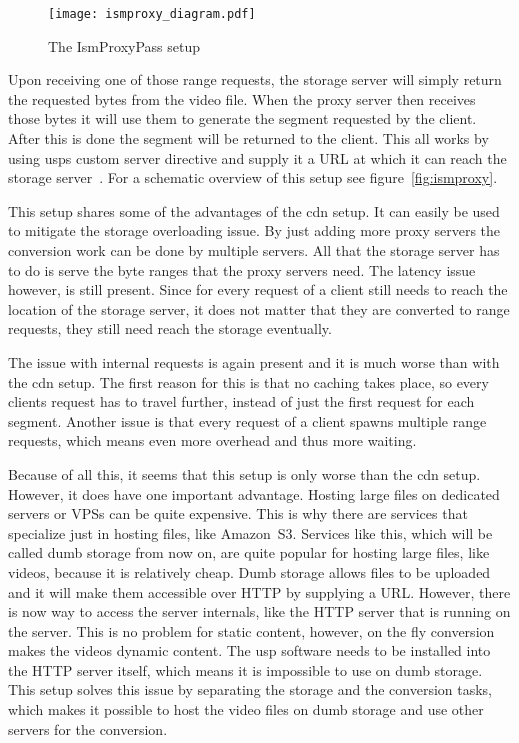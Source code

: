 \documentclass[twoside,openright]{uva-bachelor-thesis}
\begin{document}
\begin{figure}[h]
    \texttt{[image: ismproxy\_diagram.pdf]}
    \caption{The IsmProxyPass setup}\label{fig:ismproxy}
\end{figure}

Upon receiving one of those range requests, the storage server will simply
return the requested bytes from the video file. When the proxy server then
receives those bytes it will use them to generate the segment requested by the
client.  After this is done the segment will be returned to the client. This all
works by using \glspl{usp} custom \ipplong server directive and supply it a URL
at which it can reach the storage server~\autocites{uspismproxy}. For a
schematic overview of this setup see figure~\vref{fig:ismproxy}.

This setup shares some of the advantages of the \gls{cdn} setup. It can easily
be used to mitigate the storage overloading issue. By just adding more proxy
servers the conversion work can be done by multiple servers. All that the
storage server has to do is serve the byte ranges that the proxy servers need.
The latency issue however, is still present. Since for every request of a client
still needs to reach the location of the storage server, it does not matter that
they are converted to range requests, they still need reach the storage
eventually.

The issue with internal requests is again present and it is much worse than with
the \gls{cdn} setup. The first reason for this is that no caching takes place,
so every clients request has to travel further, instead of just the first
request for each segment. Another issue is that every request of a client spawns
multiple range requests, which means even more overhead and thus more waiting.

Because of all this, it seems that this setup is only worse than the \gls{cdn}
setup. However, it does have one important advantage. Hosting large files on
dedicated servers or VPSs can be quite expensive. This is why there are
services that specialize just in hosting files, like Amazon~S3. Services like
this, which will be called dumb storage from now on, are quite popular for
hosting large files, like videos, because it is relatively cheap. Dumb storage
allows files to be uploaded and it will make them accessible over HTTP by
supplying a URL\@.  However, there is now way to access the server internals,
like the HTTP server that is running on the server. This is no problem for
static content, however, on the fly conversion makes the videos dynamic content.
The \gls{usp} software needs to be installed into the HTTP server itself, which
means it is impossible to use on dumb storage. This setup solves this issue by
separating the storage and the conversion tasks, which makes it possible to host
the video files on dumb storage and use other servers for the conversion.
\end{document}
